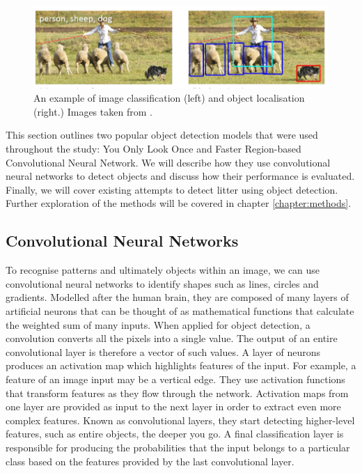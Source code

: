 \documentclass{thesis}
\begin{document}
\begin{figure}[h]
    \centering
    \includegraphics[scale=1]{images/person-sheep-dog.PNG}
    \caption{An example of image classification (left) and object localisation (right.) Images taken from \cite{lin2015microsoft}.}
    \label{fig:cnn-diagram}
\end{figure}

This section outlines two popular object detection models that were used throughout the study: You Only Look Once and Faster Region-based Convolutional Neural Network. We will describe how they use convolutional neural networks to detect objects and discuss how their performance is evaluated. Finally, we will cover existing attempts to detect litter using object detection. Further exploration of the methods will be covered in chapter \ref{chapter:methods}.

\subsection{Convolutional Neural Networks}

To recognise patterns and ultimately objects within an image, we can use convolutional neural networks to identify shapes such as lines, circles and gradients. Modelled after the human brain, they are composed of many layers of artificial neurons that can be thought of as mathematical functions that calculate the weighted sum of many inputs. When applied for object detection, a convolution converts all the pixels into a single value. The output of an entire convolutional layer is therefore a vector of such values. A layer of neurons produces an activation map which highlights features of the input. For example, a feature of an image input may be a vertical edge. They use activation functions that transform features as they flow through the network. Activation maps from one layer are provided as input to the next layer in order to extract even more complex features. Known as convolutional layers, they start detecting higher-level features, such as entire objects, the deeper you go. A final classification layer is responsible for producing the probabilities that the input belongs to a particular class based on the features provided by the last convolutional layer.
\end{document}
